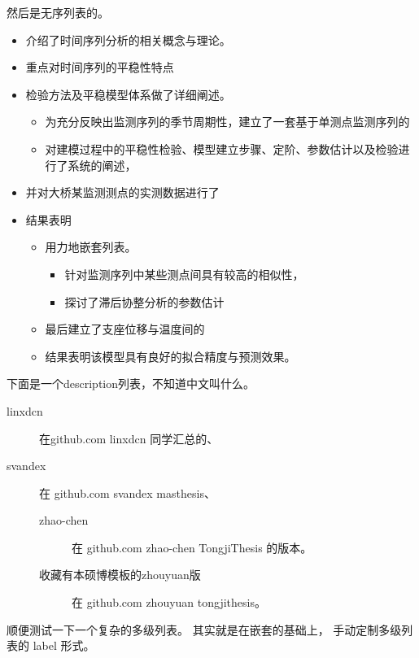 \documentclass[../Main/thesis]{subfiles}
\begin{document}
然后是无序列表的。
\begin{itemize}
  \item 介绍了时间序列分析的相关概念与理论。
  \item 重点对时间序列的平稳性特点
  \item 检验方法及平稳模型体系做了详细阐述。
  \begin{itemize}
    \item 为充分反映出监测序列的季节周期性，建立了一套基于单测点监测序列的
    \item 对建模过程中的平稳性检验、模型建立步骤、定阶、参数估计以及检验进行了系统的阐述，
  \end{itemize}
  \item 并对大桥某监测测点的实测数据进行了
  \item 结果表明
  \begin{itemize}
    \item 用力地嵌套列表。
    \begin{itemize}
      \item 针对监测序列中某些测点间具有较高的相似性，
      \item 探讨了滞后协整分析的参数估计
    \end{itemize}
    \item 最后建立了支座位移与温度间的
    \item 结果表明该模型具有良好的拟合精度与预测效果。
  \end{itemize}
\end{itemize}

下面是一个description列表，不知道中文叫什么。

\begin{description}
  \item [linxdcn] 在github.com linxdcn 同学汇总的、
  \item [svandex] 在 github.com svandex masthesis、
  \begin{description}
    \item [zhao-chen] 在 github.com zhao-chen TongjiThesis 的版本。
    \item [收藏有本硕博模板的zhouyuan版] 在 github.com zhouyuan tongjithesis。
  \end{description}
\end{description}

\zhlipsum[33]

顺便测试一下一个复杂的多级列表。
其实就是在嵌套的基础上， 手动定制多级列表的 label 形式。
\end{document}
